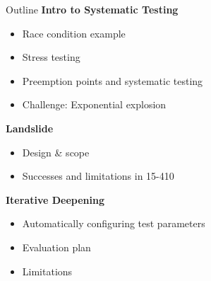 \documentclass[xcolor=dvipsnames]{beamer}
\begin{document}
\begin{frame}{Outline}
	\textbf{Intro to Systematic Testing}
	\begin{itemize}


		\item Race condition example
		\item Stress testing
		\item Preemption points and systematic testing
		\item Challenge: Exponential explosion
	\end{itemize}
	{\bf Landslide}
	\begin{itemize}
		\item Design \& scope
		\item Successes and limitations in 15-410
	\end{itemize}
	{\bf Iterative Deepening}
	\begin{itemize}
		\item Automatically configuring test parameters
		\item Evaluation plan
		\item Limitations

	\end{itemize}
\end{frame}
\end{document}
